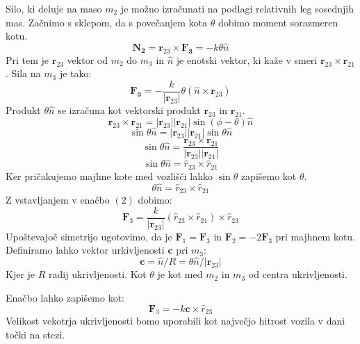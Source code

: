 \documentclass[final,5p,times,twocolumn]{elsarticle}
\begin{document}
Silo, ki deluje na maso $m_2$ je možno izračunati na podlagi relativnih leg sosednjih mas. Začnimo s sklepom, da s povečanjem kota $\theta$ dobimo moment sorazmeren kotu.
\begin{equation}
\mathbf{N_2} = \mathbf{r}_{23} \times \mathbf{F_3} = -k \theta \hat{n}
\end{equation}
Pri tem je $\mathbf{r}_{23}$ vektor od $m_2$ do $m_3$ in $\hat{n}$ je enotski vektor, ki kaže v smeri $\mathbf{r}_{23} \times \mathbf{r}_{21}$. Sila na $m_3$ je tako:
\begin{equation}
\mathbf{F_3} = -\frac{k}{|\mathbf{r}_{23}|}\theta(\hat{n} \times \mathbf{r}_{23})
\end{equation}
Produkt $\theta \hat{n}$ se izračuna kot vektorski produkt $\mathbf{r}_{23}$ in $\mathbf{r}_{21}$.
\begin{equation}
\mathbf{r}_{23} \times \mathbf{r}_{21} = |\mathbf{r}_{23}||\mathbf{r}_{21}| \sin(\phi - \theta) \hat{n}
\end{equation}
\begin{equation}
\sin\theta\hat{n} = |\mathbf{r}_{23}||\mathbf{r}_{21}|\sin\theta\hat{n}
\end{equation}
\begin{equation}
\sin\theta\hat{n} = \frac{\mathbf{r}_{23} \times \mathbf{r}_{21}}{|\mathbf{r}_{23}||\mathbf{r}_{21}|}
\end{equation}
\begin{equation}
\sin\theta\hat{n} = \hat{r}_{23} \times \hat{r}_{21}
\end{equation}
Ker pričakujemo majhne kote med vozlišči lahko $\sin\theta$ zapišemo kot $\theta$.
\begin{equation}
\theta\hat{n} = \hat{r}_{23} \times \hat{r}_{21}
\end{equation}
Z vstavljanjem v enačbo $(2)$ dobimo:
\begin{equation}
\mathbf{F}_3 = \frac{k}{|\mathbf{r}_{23}|}(\hat{r}_{23} \times \hat{r}_{21}) \times \hat{r}_{23}
\end{equation}
Upoštevajoč simetrijo ugotovimo, da je $\mathbf{F}_1 = \mathbf{F}_3$ in $\mathbf{F}_2 = -2\mathbf{F}_3$ pri majhnem kotu. Definiramo lahko vektor urkivljenosti $\mathbf{c}$ pri $m_3$:
\begin{equation}
\mathbf{c} = \hat{n}/R = \theta \hat{n} / |\mathbf{r}_{23}|
\end{equation}
Kjer je $R$ radij ukrivljenosti. Kot $\theta$ je kot med $m_2$ in $m_3$ od centra ukrivljenosti.

Enačbo lahko zapišemo kot:
\begin{equation}
\mathbf{F}_3 = -k \mathbf{c} \times \hat{r}_{23}
\end{equation}
Velikost vekotrja ukrivljenosti bomo uporabili kot največjo hitrost vozila v dani točki na stezi.
\end{document}
